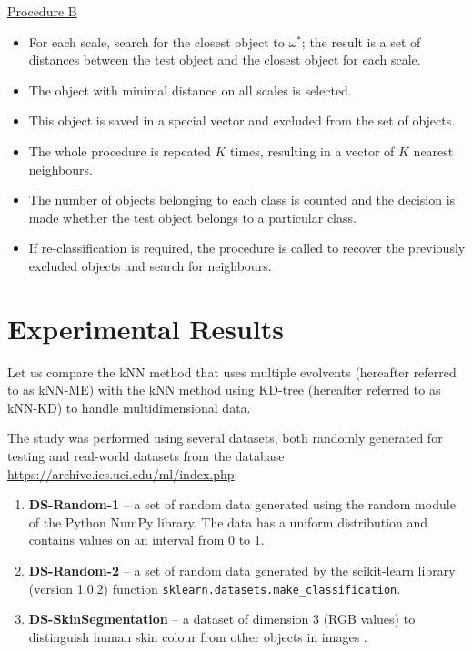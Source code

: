 \documentclass[entropy,article,submit,moreauthors,pdftex]{Definitions/mdpi}
\begin{document}
\begin{paracol}{2}
\underline{Procedure B}

\begin{itemize}
\item For each scale, search for the closest object to $\omega^*$; the result is a set of distances between the test object and the closest object for each scale.
\item The object with minimal distance on all scales is selected.
\item This object is saved in a special vector and excluded from the set of objects.
\item The whole procedure is repeated $K$ times, resulting in a vector of $K$ nearest neighbours.
\item The number of objects belonging to each class is counted and the decision is made whether   the test object belongs to a particular class.
\item If re-classification is required, the procedure is called to recover the previously excluded objects and search for neighbours.
\end{itemize}


\section{Experimental Results}\label{results}

Let us compare the kNN method that uses multiple evolvents (hereafter referred to as kNN-ME) with the kNN method using KD-tree (hereafter referred to as kNN-KD) \cite{Hou2018} to handle multidimensional data.

The study was performed using several datasets, both randomly generated for testing and real-world  datasets from the database \url{https://archive.ics.uci.edu/ml/index.php}:
\begin{enumerate}
\item
\textbf{DS-Random-1} -- a set of random data generated using the random module of the Python NumPy library. The data has a uniform distribution and contains values on an interval from 0 to 1.

\item
\textbf{DS-Random-2} -- a set of random data generated by the scikit-learn library (version 1.0.2) function \texttt{sklearn.datasets.make\_classification}.

\item
\textbf{DS-SkinSegmentation} -- a dataset of dimension 3 (RGB values) to distinguish human skin colour from other objects in images \cite{ds-1}.


\end{enumerate}
\end{paracol}
\end{document}
